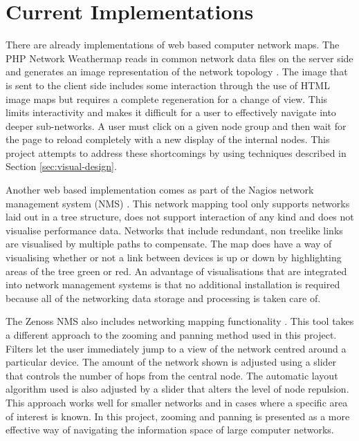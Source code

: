 \documentclass[11pt, a4paper]{report}
\begin{document}
\section{Current Implementations}
\label{sec:current-implementations}

There are already implementations of web based computer network maps. The PHP
Network Weathermap reads in common network data files on the server side and
generates an image representation of the network topology
\cite{PHP_Network_Weathermap_website}. The image that is sent to the client side
includes some interaction through the use of HTML image maps but requires a
complete regeneration for a change of view. This limits interactivity and makes
it difficult for a user to effectively navigate into deeper sub-networks. A user
must click on a given node group and then wait for the page to reload completely
with a new display of the internal nodes. This project attempts to address
these shortcomings by using techniques described in Section
\ref{sec:visual-design}. 

Another web based implementation comes as part of the Nagios network management
system (NMS) \cite{Nagios_website}. This network mapping tool only supports
networks laid out in a tree structure, does not support interaction of any kind
and does not visualise performance data. Networks that include redundant, non
treelike links are visualised by multiple paths to compensate. The map does
have a way of visualising whether or not a link between devices is up or down by
highlighting areas of the tree green or red. An advantage of visualisations that
are integrated into network management systems is that no additional
installation is required because all of the networking data storage and
processing is taken care of.

The Zenoss NMS also includes networking mapping functionality
\cite{Zenoss_website}. This tool takes a different approach to the zooming and
panning method used in this project. Filters let the user immediately jump to a
view of the network centred around a particular device. The amount of the
network shown is adjusted using a slider that controls the number of hops from
the central node. The automatic layout algorithm used is also adjusted by a
slider that alters the level of node repulsion. This approach works well for
smaller networks and in cases where a specific area of interest is known. In
this project, zooming and panning is presented as a more effective way of
navigating the information space of large computer networks.
\end{document}
